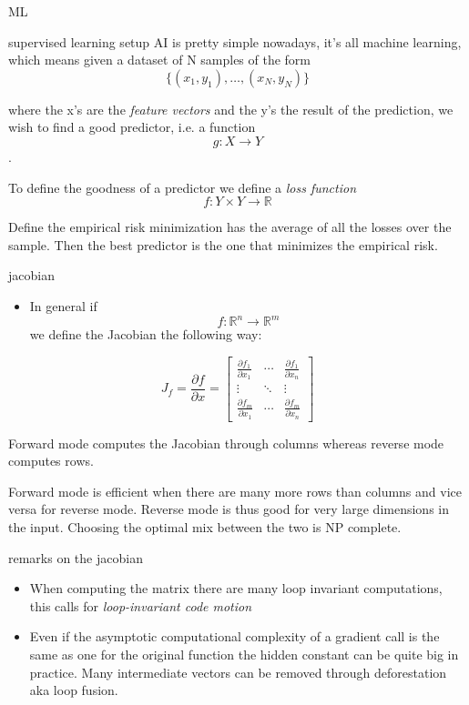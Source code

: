 \documentclass[smaller]{beamer}
\begin{document}
\begin{frame}[label={sec:orgeba2a44}]{ML}
\begin{block}{supervised learning setup}
AI is pretty simple nowadays, it's all machine learning, which means
given a dataset of N samples of the form
$$ \{(x_1,y_1), \ldots , (x_{N}, y_{N})\} $$

where the x's are the \emph{feature vectors}  and the y's the result of the prediction,
we wish to find a good predictor, i.e. a function
$$ g : X \rightarrow Y $$.

To define the goodness of a predictor we define a \emph{loss function}
$$ f: Y \times Y \rightarrow \mathbb R $$

Define the empirical risk minimization has the average of all the losses over
the sample. Then the best predictor is the one that minimizes the empirical
risk.
\end{block}
\end{frame}

\begin{frame}[label={sec:orgcbdeb75}]{jacobian}
\begin{itemize}
\item In general if $$ f : \mathbb R^n \rightarrow \mathbb R^m $$ we define the Jacobian the following way:
\end{itemize}


\begin{equation}
J_f = \frac{\partial f}{\partial x} = \begin{bmatrix}
\frac{\partial f_{1}}{\partial x_{1}} & \cdots &
\frac{\partial f_{1}}{\partial x_{n}} \\
\vdots & \ddots & \vdots \\
\frac{\partial f_{m}}{\partial  x_{1} } & \cdots &
\frac{\partial f_{m}}{\partial x_{n}}
\end{bmatrix}
\end{equation}

Forward mode computes the Jacobian through columns whereas reverse mode computes rows.

Forward mode is efficient when there are many more rows than columns and vice
versa for reverse mode. Reverse mode is thus good for very large dimensions
in the input. Choosing the optimal mix between the two  is NP complete.
\end{frame}


\begin{frame}[label={sec:orgf85f0f0}]{remarks on the jacobian}
\begin{itemize}
\item When computing the matrix there are many loop invariant computations, this
calls for \emph{loop-invariant code motion}
\item Even if the asymptotic computational complexity of a gradient call
is the same as one for the original function the hidden constant
can be quite big in practice. Many intermediate vectors can be
removed through \alert{deforestation} aka \alert{loop fusion}.
\end{itemize}
\end{frame}
\end{document}
